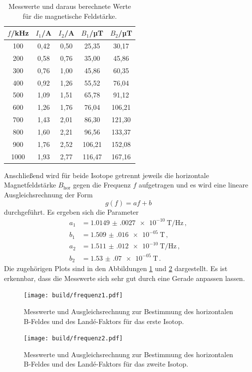 \begin{table}[htp]
	\begin{center}
    \caption{Messwerte und daraus berechnete Werte für die magnetische Feldstärke.}
    \label{tab:werte}
		\begin{tabular}{ccccc}
		\toprule
			{$f$/kHz} & {$I_1$/A} & {$I_2$/A} & {$B_1$/µT} & {$B_2$/µT}\\
			\midrule
			100 & 0,42 & 0,50 & 25,35 & 30,17\\
			200 & 0,58 & 0,76 & 35,00 & 45,86\\
			300 & 0,76 & 1,00 & 45,86 & 60,35\\
			400 & 0,92 & 1,26 & 55,52 & 76,04\\
			500 & 1,09 & 1,51 & 65,78 & 91,12\\
			600 & 1,26 & 1,76 & 76,04 & 106,21\\
			700 & 1,43 & 2,01 & 86,30 & 121,30\\
			800 & 1,60 & 2,21 & 96,56 & 133,37\\
			900 & 1,76 & 2,52 & 106,21 & 152,08\\
			1000 & 1,93 & 2,77 & 116,47 & 167,16\\
		\bottomrule
		\end{tabular}
	\end{center}
\end{table}

Anschließend wird für beide Isotope getrennt jeweils die horizontale Magnetfeldstärke $B_{\text{hor}}$
gegen die Frequenz $f$ aufgetragen und es wird eine lineare Ausgleichsrechnung der Form
\begin{equation*}
  g(f)=af+b
\end{equation*}
durchgeführt. Es ergeben sich die Parameter
\begin{align*}
 a_1&= \SI{1.0149(0027)e-10}{\tesla\per\Hz}  \,,\\
 b_1&= \SI{1.509(016)e-05}{\tesla} \,,\\
 a_2&= \SI{1.511(012)e-10}{\tesla\per\Hz} \,,\\
 b_2&= \SI{1.53(07)e-05}{\tesla} \,.
\end{align*}
Die zugehörigen Plots sind in den Abbildungen \ref{fig:frequenz1} und \ref{fig:frequenz2} dargestellt.
Es ist erkennbar, dass die Messwerte sich sehr gut durch eine Gerade anpassen lassen.
\begin{figure}
  \centering
  \texttt{[image: build/frequenz1.pdf]}
  \caption{Messwerte und Ausgleichsrechnung zur Bestimmung des horizontalen B-Feldes und des Landé-Faktors für
  das erste Isotop.}
  \label{fig:frequenz1}
\end{figure}
\begin{figure}
  \centering
  \texttt{[image: build/frequenz2.pdf]}
  \caption{Messwerte und Ausgleichsrechnung zur Bestimmung des horizontalen B-Feldes und des Landé-Faktors für
  das zweite Isotop.}
  \label{fig:frequenz2}
\end{figure}

